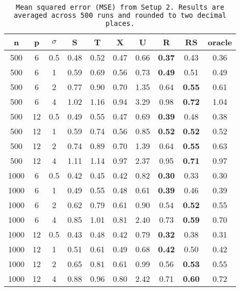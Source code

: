 \begin{table}[ht]
\centering
\begin{tabular}{cccccccccc}
  \hline
n & p & $\sigma$ & S & T & X & U & R & RS & oracle \\ 
  \hline
500 & 6 & 0.5 & 0.48 & 0.52 & 0.47 &  0.66 & \bf 0.37 & 0.43 & 0.36 \\ 
  500 & 6 & 1 & 0.59 & 0.69 & 0.56 &  0.73 & \bf 0.49 & 0.51 & 0.49 \\ 
  500 & 6 & 2 & 0.77 & 0.90 & 0.70 &  1.35 & 0.64 & \bf 0.55 & 0.61 \\ 
  500 & 6 & 4 & 1.02 & 1.16 & 0.94 &  3.29 & 0.98 & \bf 0.72 & 1.04 \\ 
  500 & 12 & 0.5 & 0.49 & 0.55 & 0.47 &  0.69 & \bf 0.39 & 0.48 & 0.38 \\ 
  500 & 12 & 1 & 0.59 & 0.74 & 0.56 &  0.85 & \bf 0.52 & \bf 0.52 & 0.52 \\ 
  500 & 12 & 2 & 0.74 & 0.89 & 0.70 &  1.39 & 0.64 & \bf 0.55 & 0.63 \\ 
  500 & 12 & 4 & 1.11 & 1.14 & 0.97 &  2.37 & 0.95 & \bf 0.71 & 0.97 \\ 
  1000 & 6 & 0.5 & 0.42 & 0.45 & 0.42 &  0.82 & \bf 0.30 & 0.33 & 0.30 \\ 
  1000 & 6 & 1 & 0.49 & 0.55 & 0.48 &  0.61 & \bf 0.39 & 0.46 & 0.39 \\ 
  1000 & 6 & 2 & 0.62 & 0.79 & 0.61 &  0.90 & 0.54 & \bf 0.52 & 0.55 \\ 
  1000 & 6 & 4 & 0.85 & 1.01 & 0.81 &  2.40 & 0.73 & \bf 0.59 & 0.70 \\ 
  1000 & 12 & 0.5 & 0.43 & 0.48 & 0.42 &  0.79 & \bf 0.32 & 0.38 & 0.31 \\ 
  1000 & 12 & 1 & 0.51 & 0.61 & 0.49 &  0.68 & \bf 0.42 & 0.50 & 0.42 \\ 
  1000 & 12 & 2 & 0.65 & 0.81 & 0.61 &  0.99 & 0.56 & \bf 0.53 & 0.55 \\ 
  1000 & 12 & 4 & 0.88 & 0.96 & 0.80 &  2.42 & 0.71 & \bf 0.60 & 0.72 \\ 
   \hline
\end{tabular}
\caption{\tt Mean squared error (MSE) from Setup 2. Results are averaged across 500 runs and rounded to two decimal places.} 
\label{table:setup2}
\end{table}
